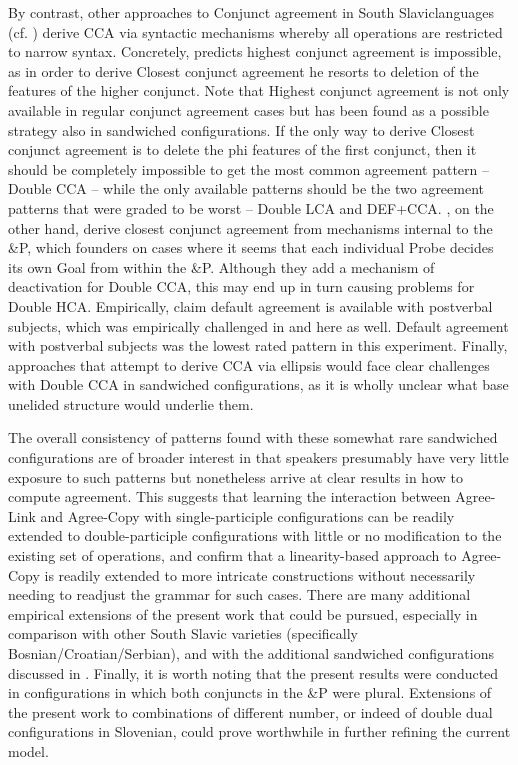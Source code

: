 \documentclass[output=paper
,modfonts
,nonflat]{langsci/langscibook}
\begin{document}
By contrast, other approaches to Conjunct agreement in South Slavic\linebreak languages (cf. \citealt{boskovic:09,puskarmurphy:17}) derive CCA via syntactic mechanisms whereby all operations are restricted to narrow syntax. Concretely, \cite{boskovic:09} predicts highest conjunct agreement is impossible, as in order to derive Closest conjunct agreement he resorts to deletion of the features of the higher conjunct. Note that Highest conjunct agreement is not only available in regular conjunct agreement cases but has been found as a possible strategy also in sandwiched configurations. If the only way to derive Closest conjunct agreement is to delete the phi features of the first conjunct, then it should be completely impossible to get the most common agreement pattern -- Double CCA -- while the only available patterns should be the two agreement patterns that were graded to be worst -- Double LCA and DEF+CCA. \cite{puskarmurphy:17}, on the other hand, derive closest conjunct agreement from mechanisms internal to the \&P, which founders on cases where it seems that each individual Probe decides its own Goal from within the \&P. Although they add a mechanism of deactivation for Double CCA, this may end up in turn causing problems for Double HCA. Empirically, \cite{puskarmurphy:17} claim default agreement is available with postverbal subjects, which was empirically challenged in \cite{willergold:16} and here as well. Default agreement with postverbal subjects was the lowest rated pattern in this experiment. Finally, approaches that attempt to derive CCA via ellipsis would face clear challenges with Double CCA in sandwiched configurations, as it is wholly unclear what base unelided structure would underlie them.

The overall consistency of patterns found with these somewhat rare sandwiched configurations are of broader interest in that speakers presumably have very little exposure to such patterns but nonetheless arrive at clear results in how to compute agreement. This suggests that learning the interaction between Agree-Link and Agree-Copy with single-participle configurations can be readily extended to double-participle configurations with little or no modification to the existing set of operations, and confirm that a linearity-based approach to Agree-Copy is readily extended to more intricate constructions without necessarily needing to readjust the grammar for such cases. There are many additional empirical extensions of the present work that could be pursued, especially in comparison with other South Slavic varieties (specifically Bosnian/Croatian/Serbian), and with the additional sandwiched configurations discussed in . Finally, it is worth noting that the present results were conducted in configurations in which both conjuncts in the \&P were plural. Extensions of the present work to combinations of different number, or indeed of double dual configurations in Slovenian, could prove worthwhile in further refining the current model.
\end{document}
